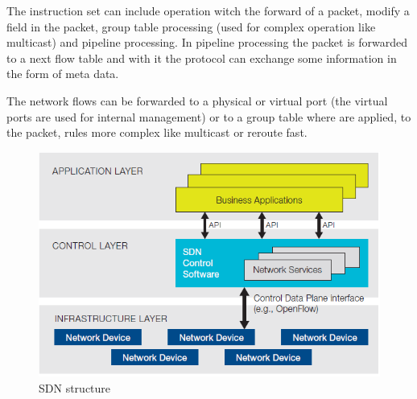 The instruction set can include operation witch the forward of a packet, modify a field in the packet, group table processing (used for complex operation like multicast) and pipeline processing. In pipeline processing the packet is forwarded to a next flow table and with it the protocol can exchange some information in the form of meta data.

The network flows can be forwarded to a physical or virtual port (the virtual ports are used for internal management) or to a group table where are applied, to the packet, rules more complex like multicast or reroute fast.

\begin{figure}
\includegraphics[scale=0.5]{Introduction/Image/SDNStructure.png}
\caption{\ac{SDN} structure}
\label{fig:sdn-and-openflow-overview:sdn-structure}
\end{figure}